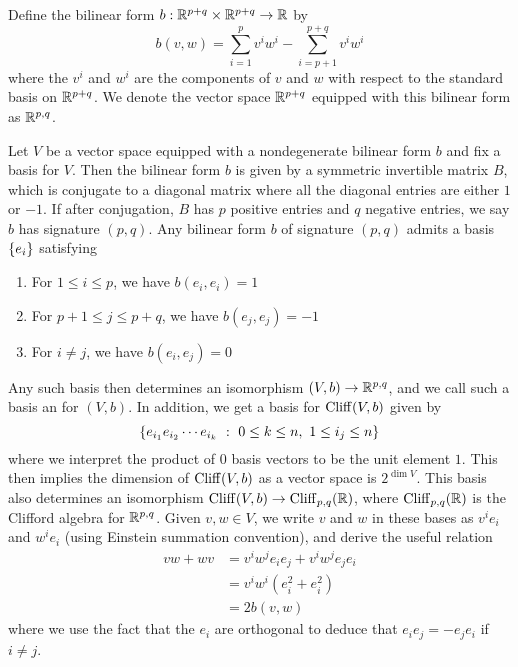 %
\begin{defn}
Define the bilinear form $b : \mathbb{R}^{p+q} \times \mathbb{R}^{p+q} \to \mathbb{R}$ by
\[
b(v,w) = \sum_{i = 1}^{p} v^iw^i - \sum_{i = p+1}^{p+q} v^iw^i
\]
where the $v^i$ and $w^i$ are the components of $v$ and $w$ with respect to
the standard basis on $\mathbb{R}^{p+q}$. We denote the vector space $\mathbb{R}^{p+q}$
equipped with this bilinear form as $\mathbb{R}^{p,q}$.
\end{defn}
%
Let $V$ be a vector space equipped with a nondegenerate bilinear form $b$ and
fix a basis for $V$. Then the bilinear form $b$ is given by a symmetric
invertible matrix $B$, which is conjugate to a diagonal matrix where all
the diagonal entries are either $1$ or $-1$. If after conjugation, $B$ has
$p$ positive entries and $q$ negative entries, we say $b$ has signature $(p,q)$.
Any bilinear form $b$ of signature $(p,q)$ admits a basis $\left\lbrace e_i \right\rbrace$ satisfying
%
\begin{enumerate}
\item For $1 \leq i \leq p$, we have $b(e_i,e_i) = 1$
\item For $p+1 \leq j \leq p+q$, we have $b(e_j,e_j) = -1$
\item For $i \neq j$, we have $b(e_i,e_j) = 0$
\end{enumerate}
%
Any such basis then determines an isomorphism $(V,b) \to \mathbb{R}^{p,q}$, and we
call such a basis an  for $(V,b)$.
In addition, we get a basis for $\operatorname{Cliff}(V,b)$ given by
\[
\left\lbrace e_{i_1}e_{i_2}\cdots e_{i_k}~:~ 0 \leq k \leq n, ~ 1 \leq i_j \leq n \right\rbrace
\]
where we interpret the product of $0$ basis vectors to be the unit element $1$.
This then implies the dimension of $\operatorname{Cliff}(V,b)$ as a vector space is
$2^{\dim V}$. This basis also determines an isomorphism
$\operatorname{Cliff}(V,b) \to \operatorname{Cliff}_{p,q}(\mathbb{R})$, where $\operatorname{Cliff}_{p,q}(\mathbb{R})$ is the Clifford
algebra for $\mathbb{R}^{p,q}$. Given $v,w \in V$, we write $v$ and $w$ in these
bases as $v^ie_i$ and $w^ie_i$ (using Einstein summation convention),
and derive the useful relation
%
\begin{align*}
vw + wv & = v^iw^je_ie_j + v^iw^je_je_i \\
     & = v^iw^i(e_i^2 + e_i^2)       \\
     & = 2b(v,w)
\end{align*}
where we use the fact that the $e_i$ are orthogonal to deduce that
$e_ie_j = -e_je_i$ if $i \neq j$.
%
